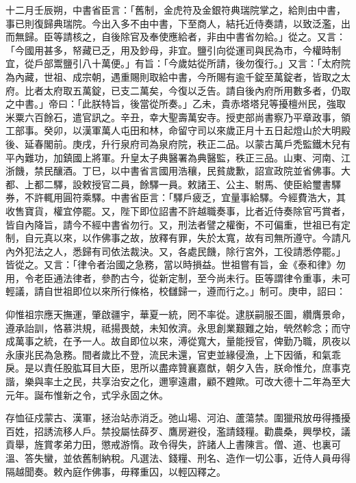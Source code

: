 \begin{pinyinscope}
 十二月壬辰朔，中書省臣言：「舊制，金虎符及金銀符典瑞院掌之，給則由中書，事已則復歸典瑞院。今出入多不由中書，下至商人，結托近侍奏請，以致泛濫，出而無歸。臣等請核之，自後除官及奉使應給者，非由中書省勿給。」從之。又言：「今國用甚多，帑藏已乏，用及鈔母，非宜。鹽引向從運司與民為市，今權時制宜，從戶部鬻鹽引八十萬便。」有旨：「今歲姑從所請，後勿復行。」又言：「太府院為內藏，世祖、成宗朝，遇重賜則取給中書，今所賜有逾千錠至萬錠者，皆取之太府。比者太府取五萬錠，已支二萬矣，今復以乏告。請自後內府所用數多者，仍取之中書。」帝曰：「此朕特旨，後當從所奏。」乙未，貴赤塔塔兒等擾檀州民，強取米粟六百餘石，遣官訊之。辛丑，幸大聖壽萬安寺。授吏部尚書察乃平章政事，領工部事。癸卯，以漢軍萬人屯田和林，命留守司以來歲正月十五日起燈山於大明殿後、延春閣前。庚戌，升行泉府司為泉府院，秩正二品。以蒙古萬戶禿監鐵木兒有平內難功，加鎮國上將軍。升皇太子典醫署為典醫監，秩正三品。山東、河南、江浙饑，禁民釀酒。丁巳，以中書省言國用浩穰，民貧歲歉，詔宣政院並省佛事。大都、上都二驛，設敕授官二員，餘驛一員。敕諸王、公主、駙馬、使臣給璽書驛券，不許輒用圓符乘驛。中書省臣言：「驛戶疲乏，宜量事給驛。今經費浩大，其收售寶貨，權宜停罷。又，陛下即位詔書不許越職奏事，比者近侍奏除官丐賞者，皆自內降旨，請今不經中書省勿行。又，刑法者譬之權衡，不可偏重，世祖已有定制，自元真以來，以作佛事之故，放釋有罪，失於太寬，故有司無所遵守。今請凡內外犯法之人，悉歸有司依法裁決。又，各處民饑，除行宮外，工役請悉停罷。」皆從之。又言：「律令者治國之急務，當以時損益。世祖嘗有旨，金《泰和律》勿用，令老臣通法律者，參酌古今，從新定制，至今尚未行。臣等謂律令重事，未可輕議，請自世祖即位以來所行條格，校讎歸一，遵而行之。」制可。庚申，詔曰：



 仰惟祖宗應天撫運，肇啟疆宇，華夏一統，罔不率從。逮朕嗣服丕圖，纘膺景命，遵承詒訓，恪慕洪規，祗揚畏兢，未知攸濟。永思創業艱難之始，煢然軫念；而守成萬事之統，在予一人。故自即位以來，溥從寬大，量能授官，俾勤乃職，夙夜以永康兆民為急務。間者歲比不登，流民未還，官吏並緣侵漁，上下因循，和氣乖戾。是以責任股肱耳目大臣，思所以盡瘁贊襄嘉猷，朝夕入告，朕命惟允，庶事克諧，樂與率土之民，共享治安之化，邇寧遠肅，顧不韙歟。可改大德十二年為至大元年。誕布惟新之令，式孚永固之休。



 存恤征戍蒙古、漢軍，拯治站赤消乏。弛山場、河泊、蘆蕩禁。圍獵飛放毋得搔擾百姓，招誘流移人戶。禁投屬怯薛歹、鷹房避役，濫請錢糧。勸農桑，興學校，議貢舉，旌賞孝弟力田，懲戒游惰。政令得失，許諸人上書陳言。僧、道、也裏可溫、答失蠻，並依舊制納稅。凡選法、錢糧、刑名、造作一切公事，近侍人員毋得隔越聞奏。敕內庭作佛事，毋釋重囚，以輕囚釋之。




\end{pinyinscope}
